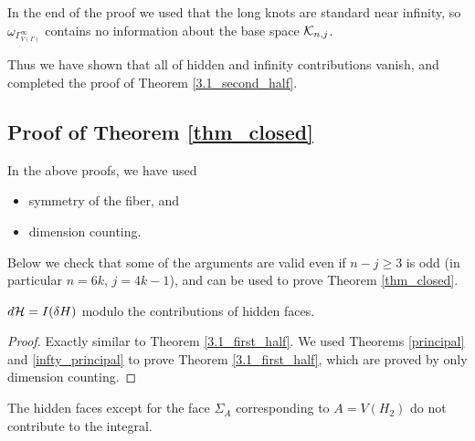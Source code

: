 \begin{rem}
In the end of the proof we used that the long knots are standard near infinity, so $\omega_{\Gamma^{\infty}_{V(\Gamma )}}$
contains no information about the base space $\mathcal{K}_{n ,j}$.
\end{rem}


Thus we have shown that all of hidden and infinity contributions vanish, and completed the proof of
Theorem \ref{3.1_second_half}.





\subsection{Proof of Theorem \ref{thm_closed}}\label{subsec_proof_closed}
In the above proofs, we have used
\begin{itemize}
\item symmetry of the fiber, and
\item dimension counting.
\end{itemize}
Below we check that some of the arguments are valid even if $n-j \ge 3$ is odd (in particular $n=6k$, $j=4k-1$), and
can be used to prove Theorem \ref{thm_closed}.


\begin{lem}\label{lem_dH=0}
$d\mathcal{H} =I(\delta H)$ modulo the contributions of hidden faces.
\end{lem}


\begin{proof}
Exactly similar to Theorem \ref{3.1_first_half}.
We used Theorems \ref{principal} and \ref{infty_principal} to prove Theorem \ref{3.1_first_half}, which are proved by
only dimension counting.
\end{proof}


\begin{lem}\label{lem_dH_hidden}
The hidden faces except for the face $\Sigma_A$ corresponding to $A=V(H_2 )$ do not contribute to the integral.
\end{lem}


